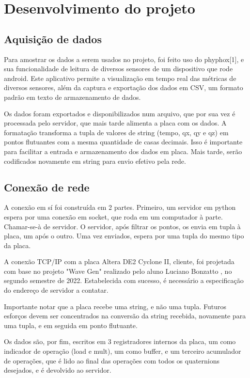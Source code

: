 \documentclass [12pt,oneside] {article}
\begin{document}
\newpage

\section{Desenvolvimento do projeto}

\subsection{Aquisição de dados}

	Para amostrar os dados a serem usados no projeto, foi feito
uso do phyphox[1], e sua funcionalidade de leitura de diversos
sensores de um dispositivo que rode android. Este aplicativo permite a
visualização em tempo real das métricas de diversos sensores, além da
captura e exportação dos dados em CSV, um formato padrão em texto de
armazenamento de dados.

	Os dados foram exportados e disponibilizados num arquivo, que
por sua vez é processada pelo servidor, que mais tarde alimenta a
placa com os dados. A formatação transforma a tupla de valores de
string (tempo, qx, qy e qz) em pontos flutuantes com a mesma
quantidade de casas decimais. Isso é importante para facilitar a
entrada e armazenamento dos dados em placa. Mais tarde, serão
codificados novamente em string para envio efetivo pela rede.

\subsection{Conexão de rede}

	A conexão em sí foi construída em 2 partes. Primeiro, um
servidor em python espera por uma conexão em socket, que roda em um
computador à parte. Chamar-se-à de servidor. O servidor, após filtrar
os pontos, os envia em tupla à placa, um após o outro. Uma vez
enviados, espera por uma tupla do mesmo tipo da placa.

	A conexão TCP/IP com a placa Altera DE2 Cyclone II, cliente,
foi projetada com base no projeto "Wave Gen" realizado pelo aluno
Luciano Bonzatto , no segundo semestre de 2022. Estabelecida com
sucesso, é necessário a especificação do endereço de servidor a
contatar.

	Importante notar que a placa recebe uma string, e não uma
tupla. Futuros esforços devem ser concentrados na conversão da string
recebida, novamente para uma tupla, e em seguida em ponto flutuante.

	Os dados são, por fim, escritos em 3 registradores internos da
placa, um como indicador de operação (load e mult), um como buffer, e
um terceiro acumulador de operações, que é lido ao final das operações
com todos os quaternions desejados, e é devolvido ao servidor.
\end{document}
